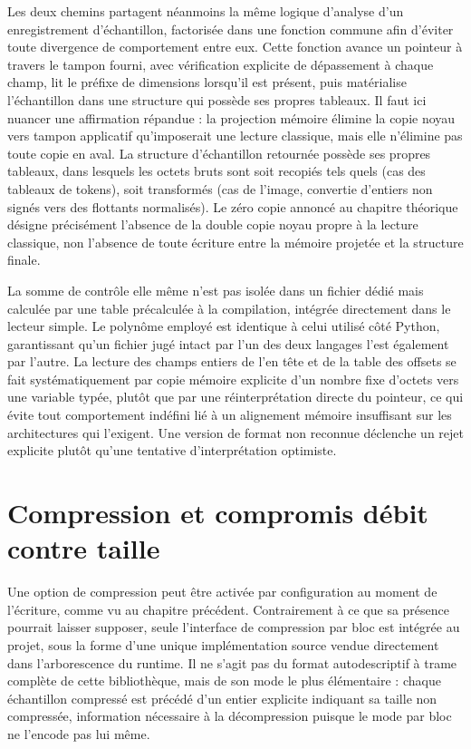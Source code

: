 \documentclass[12pt,a4paper]{report}
\begin{document}
Les deux chemins partagent néanmoins la même logique d'analyse d'un enregistrement d'échantillon, factorisée dans une fonction commune afin d'éviter toute divergence de comportement entre eux. Cette fonction avance un pointeur à travers le tampon fourni, avec vérification explicite de dépassement à chaque champ, lit le préfixe de dimensions lorsqu'il est présent, puis matérialise l'échantillon dans une structure qui possède ses propres tableaux. Il faut ici nuancer une affirmation répandue : la projection mémoire élimine la copie noyau vers tampon applicatif qu'imposerait une lecture classique, mais elle n'élimine pas toute copie en aval. La structure d'échantillon retournée possède ses propres tableaux, dans lesquels les octets bruts sont soit recopiés tels quels (cas des tableaux de tokens), soit transformés (cas de l'image, convertie d'entiers non signés vers des flottants normalisés). Le zéro copie annoncé au chapitre théorique désigne précisément l'absence de la double copie noyau propre à la lecture classique, non l'absence de toute écriture entre la mémoire projetée et la structure finale.

La somme de contrôle elle même n'est pas isolée dans un fichier dédié mais calculée par une table précalculée à la compilation, intégrée directement dans le lecteur simple. Le polynôme employé est identique à celui utilisé côté Python, garantissant qu'un fichier jugé intact par l'un des deux langages l'est également par l'autre. La lecture des champs entiers de l'en tête et de la table des offsets se fait systématiquement par copie mémoire explicite d'un nombre fixe d'octets vers une variable typée, plutôt que par une réinterprétation directe du pointeur, ce qui évite tout comportement indéfini lié à un alignement mémoire insuffisant sur les architectures qui l'exigent. Une version de format non reconnue déclenche un rejet explicite plutôt qu'une tentative d'interprétation optimiste.

\section{Compression et compromis débit contre taille}
\label{sec:compression_lz4}

Une option de compression peut être activée par configuration au moment de l'écriture, comme vu au chapitre précédent. Contrairement à ce que sa présence pourrait laisser supposer, seule l'interface de compression par bloc est intégrée au projet, sous la forme d'une unique implémentation source vendue directement dans l'arborescence du runtime. Il ne s'agit pas du format autodescriptif à trame complète de cette bibliothèque, mais de son mode le plus élémentaire : chaque échantillon compressé est précédé d'un entier explicite indiquant sa taille non compressée, information nécessaire à la décompression puisque le mode par bloc ne l'encode pas lui même.
\end{document}
